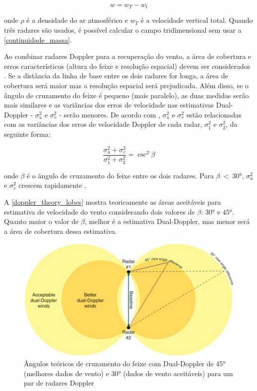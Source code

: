 \begin{equation}
	w=w_T-w_t
\end{equation}

\noindent
onde $\rho$ é a densidade do ar atmosférico e $w_T$ é a velocidade vertical total. Quando três radares são usados, é possível calcular o campo tridimensional sem usar a \autoref{continuidade_massa}.

Ao combinar radares Doppler para a recuperação do vento, a área de cobertura e erros característicos (altura do feixe e resolução espacial) devem ser considerados \cite{Dolan2007}. Se a distância da linha de base entre os dois radares for longa, a área de cobertura será maior mas a resolução espacial será prejudicada. Além disso, se o ângulo de cruzamento do feixe é pequeno (mais paralelo), as duas medidas serão mais similares e as variâncias dos erros de velocidade nas estimativas Dual-Doppler - $\sigma_u^2$ e $\sigma_v^2$ - serão menores. De acordo com , $\sigma_u^2$ e $\sigma_v^2$ estão relacionadas com as variâncias dos erros de velocidade Doppler de cada radar, $\sigma_1^2$ e $\sigma_2^2$, da seguinte forma:

\begin{equation}
	\frac{\sigma_u^2+ \sigma_v^2}{\sigma_1^2 + \sigma_2^2}=\csc^2{\beta}
\end{equation}

\noindent
onde $\beta$ é o ângulo de cruzamento do feixe entre os dois radares. Para $\beta\:<\:\ang{30}$, $\sigma_u^2$ e $\sigma_v^2$ crescem rapidamente \cite{Doviak1976, Davies-Jones1979, Doviak1993}.

A \autoref{doppler_theory_lobes} mostra teoricamente as áreas aceitáveis para estimativa de velocidade do vento considerando dois valores de $\beta$: $\ang{30}$ e $\ang{45}$. Quanto maior o valor de $\beta$, melhor é a estimativa Dual-Doppler, mas menor será a área de cobertura dessa estimativa.

\begin{figure}[htb]
	\begin{center}
		\caption{Ângulos teóricos de cruzamento do feixe com Dual-Doppler de \ang{45} (melhores dados de vento) e \ang{30} (dados de vento aceitáveis) para um par de radares Doppler} 
		\label{doppler_theory_lobes}
		\includegraphics[width=\columnwidth]{figs/lobes_eastin.png}
	\end{center}
\end{figure}

